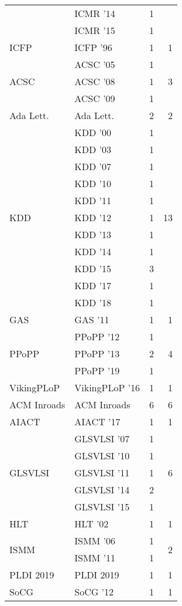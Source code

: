 \begin{table*}[t]
\begin{tabular}{llrr}
& ICMR '14 & 1 &\\
& ICMR '15 & 1 &\\
\multirow{1}{*}{ICFP } & ICFP '96 & 1 & \multirow{1}{*}{1}\\
\multirow{3}{*}{ACSC } & ACSC '05 & 1 & \multirow{3}{*}{3}\\
& ACSC '08 & 1 &\\
& ACSC '09 & 1 &\\
\multirow{1}{*}{Ada Lett.} & Ada Lett. & 2 & \multirow{1}{*}{2}\\
\multirow{11}{*}{KDD } & KDD '00 & 1 & \multirow{11}{*}{13}\\
& KDD '03 & 1 &\\
& KDD '07 & 1 &\\
& KDD '10 & 1 &\\
& KDD '11 & 1 &\\
& KDD '12 & 1 &\\
& KDD '13 & 1 &\\
& KDD '14 & 1 &\\
& KDD '15 & 3 &\\
& KDD '17 & 1 &\\
& KDD '18 & 1 &\\
\multirow{1}{*}{GAS } & GAS '11 & 1 & \multirow{1}{*}{1}\\
\multirow{3}{*}{PPoPP } & PPoPP '12 & 1 & \multirow{3}{*}{4}\\
& PPoPP '13 & 2 &\\
& PPoPP '19 & 1 &\\
\multirow{1}{*}{VikingPLoP } & VikingPLoP '16 & 1 & \multirow{1}{*}{1}\\
\multirow{1}{*}{ACM Inroads} & ACM Inroads & 6 & \multirow{1}{*}{6}\\
\multirow{1}{*}{AIACT } & AIACT '17 & 1 & \multirow{1}{*}{1}\\
\multirow{5}{*}{GLSVLSI } & GLSVLSI '07 & 1 & \multirow{5}{*}{6}\\
& GLSVLSI '10 & 1 &\\
& GLSVLSI '11 & 1 &\\
& GLSVLSI '14 & 2 &\\
& GLSVLSI '15 & 1 &\\
\multirow{1}{*}{HLT } & HLT '02 & 1 & \multirow{1}{*}{1}\\
\multirow{2}{*}{ISMM } & ISMM '06 & 1 & \multirow{2}{*}{2}\\
& ISMM '11 & 1 &\\
\multirow{1}{*}{PLDI 2019} & PLDI 2019 & 1 & \multirow{1}{*}{1}\\
\multirow{1}{*}{SoCG } & SoCG '12 & 1 & \multirow{1}{*}{1}\\

\end{tabular}
\end{table*}
